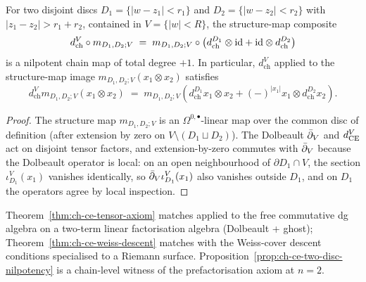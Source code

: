 \begin{proposition}
\label{prop:ch-ce-two-disc-nilpotency}
%
For two disjoint discs $D_1 = \{|w-z_1|<r_1\}$ and $D_2 = \{|w-z_2|<r_2\}$
with $|z_1-z_2|>r_1+r_2$, contained in $V = \{|w|<R\}$, the
structure-map composite
\begin{equation}
\label{eq:two-disc-composite}
d_{\mathrm{ch}}^V \circ m_{D_1,D_2;V}
\;=\;
m_{D_1,D_2;V}\circ\bigl(d_{\mathrm{ch}}^{D_1}\otimes\mathrm{id} + \mathrm{id}\otimes
d_{\mathrm{ch}}^{D_2}\bigr)
\end{equation}
is a nilpotent chain map of total degree $+1$. In particular,
$d_{\mathrm{ch}}^V$ applied to the structure-map image
$m_{D_1,D_2;V}(x_1\otimes x_2)$ satisfies
\begin{equation}
d_{\mathrm{ch}}^V m_{D_1,D_2;V}(x_1\otimes x_2)
\;=\;
m_{D_1,D_2;V}(d_{\mathrm{ch}}^{D_1}x_1\otimes x_2 + (-)^{|x_1|}
x_1\otimes d_{\mathrm{ch}}^{D_2}x_2).
\end{equation}
\end{proposition}

\begin{proof}
The structure map $m_{D_1,D_2;V}$ is an $\Omega^{0,\bullet}$-linear map
over the common disc of definition (after extension by zero on
$V\setminus(D_1\sqcup D_2)$). The Dolbeault $\bar\partial_V$ and
$d_{\mathrm{CE}}^V$ act on disjoint tensor factors, and extension-by-zero
commutes with $\bar\partial_V$ because the Dolbeault operator is local: on an
open neighbourhood of $\partial D_1\cap V$, the section
$\iota^V_{D_1}(x_1)$ vanishes identically, so $\bar\partial_V\iota^V_{D_1}(x_1)$
also vanishes outside $D_1$, and on $D_1$ the operators agree by local
inspection.
\end{proof}

\begin{remark}
\label{rem:ch-ce-factalg-primary}
Theorem~\ref{thm:ch-ce-tensor-axiom} matches
\cite[Def.\,3.1.4]{CostelloGwilliam2017} applied to the free commutative
dg algebra on a two-term linear factorisation algebra (Dolbeault +
ghost); Theorem~\ref{thm:ch-ce-weiss-descent} matches
\cite[Prop.\,4.3.4]{CostelloGwilliam2017} with the Weiss-cover
descent conditions specialised to a Riemann surface.
Proposition~\ref{prop:ch-ce-two-disc-nilpotency} is a chain-level
witness of the prefactorisation axiom at $n=2$.
\end{remark}

